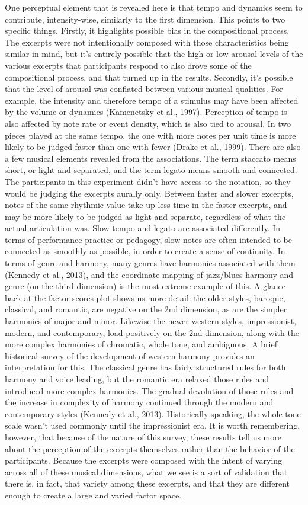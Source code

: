 \documentclass[
  english,
  man,floatsintext]{apa6}
\begin{document}
One perceptual element that is revealed here is that tempo and dynamics seem to contribute, intensity-wise, similarly to the first dimension. This points to two specific things. Firstly, it highlights possible bias in the compositional process. The excerpts were not intentionally composed with those characteristics being similar in mind, but it's entirely possible that the high or low arousal levels of the various excerpts that participants respond to also drove some of the compositional process, and that turned up in the results. Secondly, it's possible that the level of arousal was conflated between various musical qualities. For example, the intensity and therefore tempo of a stimulus may have been affected by the volume or dynamics (Kamenetsky et al., 1997). Perception of tempo is also affected by note rate or event density, which is also tied to arousal. In two pieces played at the same tempo, the one with more notes per unit time is more likely to be judged faster than one with fewer (Drake et al., 1999).
There are also a few musical elements revealed from the associations. The term staccato means short, or light and separated, and the term legato means smooth and connected. The participants in this experiment didn't have access to the notation, so they would be judging the excerpts aurally only. Between faster and slower excerpts, notes of the same rhythmic value take up less time in the faster excerpts, and may be more likely to be judged as light and separate, regardless of what the actual articulation was. Slow tempo and legato are associated differently. In terms of performance practice or pedagogy, slow notes are often intended to be connected as smoothly as possible, in order to create a sense of continuity. In terms of genre and harmony, many genres have harmonies associated with them (Kennedy et al., 2013), and the coordinate mapping of jazz/blues harmony and genre (on the third dimension) is the most extreme example of this. A glance back at the factor scores plot shows us more detail: the older styles, baroque, classical, and romantic, are negative on the 2nd dimension, as are the simpler harmonies of major and minor. Likewise the newer western styles, impressionist, modern, and contemporary, load positively on the 2nd dimension, along with the more complex harmonies of chromatic, whole tone, and ambiguous. A brief historical survey of the development of western harmony provides an interpretation for this. The classical genre has fairly structured rules for both harmony and voice leading, but the romantic era relaxed those rules and introduced more complex harmonies. The gradual devolution of those rules and the increase in complexity of harmony continued through the modern and contemporary styles (Kennedy et al., 2013). Historically speaking, the whole tone scale wasn't used commonly until the impressionist era.
It is worth remembering, however, that because of the nature of this survey, these results tell us more about the perception of the excerpts themselves rather than the behavior of the participants. Because the excerpts were composed with the intent of varying across all of these musical dimensions, what we see is a sort of validation that there is, in fact, that variety among these excerpts, and that they are different enough to create a large and varied factor space.
\end{document}
